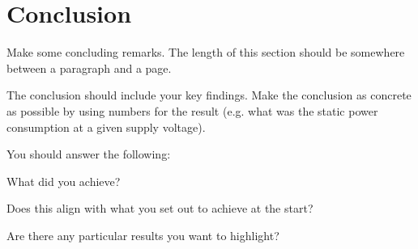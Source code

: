 \section{Conclusion}
Make some concluding remarks. The length of this section should be somewhere between a paragraph and a page.

The conclusion should include your key findings. Make the conclusion as concrete as possible by using numbers for the result (e.g. what was the static power consumption at a given supply voltage).

You should answer the following:

\quad What did you achieve?

\quad Does this align with what you set out to achieve at the start?

\quad Are there any particular results you want to highlight?
